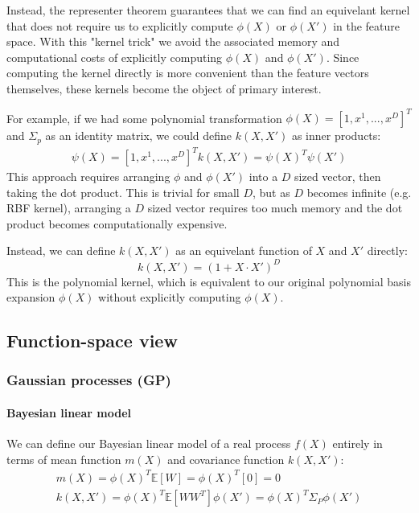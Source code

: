 Instead, the representer theorem guarantees that we can find an equivelant kernel that does not require us to explicitly compute $\phi(X)$ or $\phi(X')$ in the feature space. With this "kernel trick" we avoid the associated memory and computational costs of explicitly computing $\phi(X)$ and $\phi(X')$. Since computing the kernel directly is more convenient than the feature vectors themselves, these kernels become the object of primary interest.

For example, if we had some polynomial transformation $\phi(X) = [1, x^1, ..., x^D]^T$ and $\Sigma_p$ as an identity matrix, we could define $k(X,X')$ as inner products:
\begin{equation*}
    \begin{aligned}
        \psi(X) = [1, x^1, ..., x^D]^T
        k(X,X') = \psi(X)^T\psi(X')
    \end{aligned}
\end{equation*}
This approach requires arranging $\phi$ and $\phi(X')$ into a $D$ sized vector, then taking the dot product. This is trivial for small $D$, but as $D$ becomes infinite (e.g. RBF kernel), arranging a $D$ sized vector requires too much memory and the dot product becomes computationally expensive.

Instead, we can define $k(X,X')$ as an equivelant function of $X$ and $X'$ directly:
\begin{equation*}
    k(X,X') = (1 + X \cdot X')^D
\end{equation*}
This is the polynomial kernel, which is equivalent to our original polynomial basis expansion $\phi(X)$ without explicitly computing $\phi(X)$.



\subsection{Function-space view \cite{gp-ml}}

\subsubsection{Gaussian processes (GP)}

\paragraph{Bayesian linear model}
We can define our Bayesian linear model of a real process $f(X)$ entirely in terms of mean function $m(X)$ and covariance function $k(X,X')$:
\begin{equation*}
    \begin{aligned}
        m(X) = \phi(X)^T\mathbb{E}[W] = \phi(X)^T[0] = 0 \\
        k(X,X') = \phi(X)^T\mathbb{E}[WW^T]\phi(X') = \phi(X)^T\Sigma_P\phi(X')
    \end{aligned}
\end{equation*}

